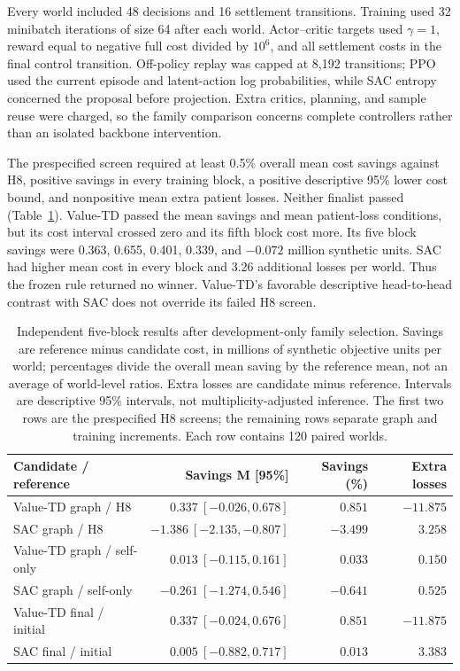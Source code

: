 \documentclass[preprint,review,12pt]{elsarticle}
\begin{document}
Every world included 48 decisions and 16 settlement transitions. Training
used 32 minibatch iterations of size 64 after each world. Actor--critic
targets used $\gamma=1$, reward equal to negative full cost divided by
$10^6$, and all settlement costs in the final control transition. Off-policy
replay was capped at 8,192 transitions; PPO used the current episode and
latent-action log probabilities, while SAC entropy concerned the proposal
before projection. Extra critics, planning, and sample reuse were charged,
so the family comparison concerns complete controllers rather than an
isolated backbone intervention.

The prespecified screen required at least 0.5\% overall mean cost savings
against H8, positive savings in every training block, a positive descriptive
95\% lower cost bound, and nonpositive mean extra patient losses.
Neither finalist passed (Table~\ref{tab:family-selection}). Value-TD passed
the mean savings and mean patient-loss conditions, but its cost interval
crossed zero and its fifth block cost more. Its five block savings were
0.363, 0.655, 0.401, 0.339, and $-0.072$ million synthetic units.
SAC had higher mean cost in every block and 3.26 additional losses per world.
Thus the frozen rule returned no winner. Value-TD's favorable descriptive
head-to-head contrast with SAC does not override its failed H8 screen.

\begin{table}[tbp]
\centering
\caption{Independent five-block results after development-only family
selection. Savings are reference minus candidate cost, in millions of
synthetic objective units per world; percentages divide the overall mean
saving by the reference mean, not an average of world-level ratios.
Extra losses are candidate minus reference. Intervals are descriptive
95\% intervals, not multiplicity-adjusted inference. The first two rows
are the prespecified H8 screens; the remaining rows separate graph and
training increments. Each row contains 120 paired worlds.}
\label{tab:family-selection}
\small
\setlength{\tabcolsep}{4pt}
\begin{tabularx}{\textwidth}{Xrrr}
\toprule
Candidate / reference & Savings M [95\%] & Savings (\%) & Extra losses \\
\midrule
Value-TD graph / H8 & $0.337\ [-0.026,0.678]$ & $0.851$ & $-11.875$ \\
SAC graph / H8 & $-1.386\ [-2.135,-0.807]$ & $-3.499$ & $3.258$ \\
Value-TD graph / self-only & $0.013\ [-0.115,0.161]$ & $0.033$ & $0.150$ \\
SAC graph / self-only & $-0.261\ [-1.274,0.546]$ & $-0.641$ & $0.525$ \\
Value-TD final / initial & $0.337\ [-0.024,0.676]$ & $0.851$ & $-11.875$ \\
SAC final / initial & $0.005\ [-0.882,0.717]$ & $0.013$ & $3.383$ \\
\bottomrule
\end{tabularx}
\end{table}
\end{document}
